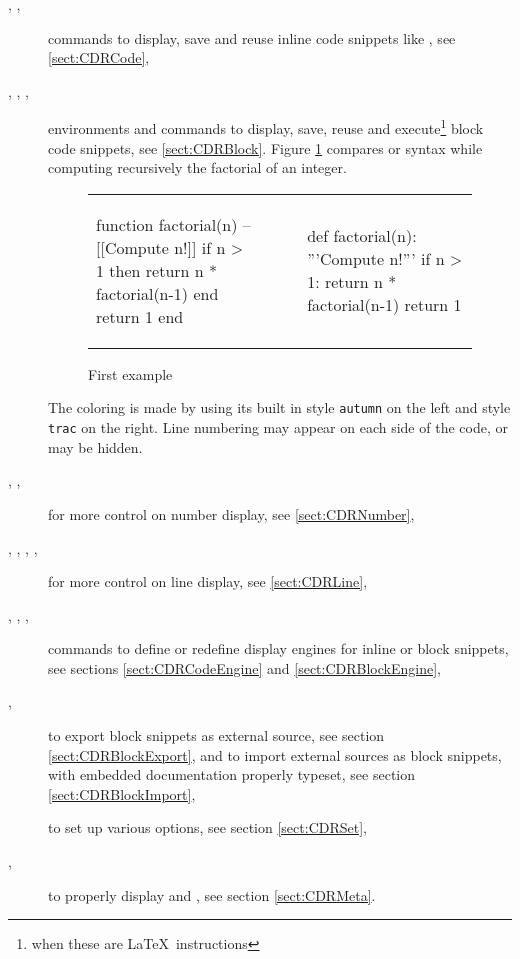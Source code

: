 \documentclass{article}
\begin{document}
\begin{description}
\item[{}, , ]
commands to display, save and reuse inline code snippets
like , see \ref{sect:CDRCode},
\item[, , , ] environments
and commands to display, save, reuse and execute\footnote{when these are \LaTeX\ instructions} block code snippets, see \ref{sect:CDRBlock}.
Figure \ref{fig:First example} compares  or  syntax while computing recursively the factorial of an integer.
\begin{figure}[h!]
\begin{center}
\setlength{\tabcolsep}{0mm}
\begin{tabular}{p{0.45\linewidth}p{0.05\linewidth}|p{0.05\linewidth}p{0.45\linewidth}}
\begin{CDRBlock}[tags=lua, no space above]
function factorial(n)
  --[[Compute n!]]
  if n > 1 then
    return n * factorial(n-1)
  end
  return 1
end
\end{CDRBlock}
&&&
\begin{CDRBlock}[tags=py, no space above]
def factorial(n):
  '''Compute n!'''
  if n > 1:
    return n * factorial(n-1)
  return 1
\end{CDRBlock}
\end{tabular}
\end{center}
\caption{First example}
\label{fig:First example}
\end{figure}
The coloring is made by  using its built in style \texttt{autumn} on the left and style \texttt{trac} on the right. Line numbering may appear on each side of the code, or may be hidden.
\item[{%
,
,
}]
for more control on number display, see \ref{sect:CDRNumber},
\item[{%
,
,
,
,
}]
for more control on line display, see \ref{sect:CDRLine},
\item[{%
,
,
,
%
}]
commands to define or redefine display engines
for inline or block snippets,
see sections \ref{sect:CDRCodeEngine} and \ref{sect:CDRBlockEngine},
\item[, ]
to export block snippets as external source,
see section \ref{sect:CDRBlockExport},
and to import external sources as block snippets,
with embedded documentation properly typeset,
see section \ref{sect:CDRBlockImport},
\item[]
to set up various options,
see section \ref{sect:CDRSet},
\item[, ] 
to properly display  and ,
see section \ref{sect:CDRMeta}.
\end{description}
\end{document}
